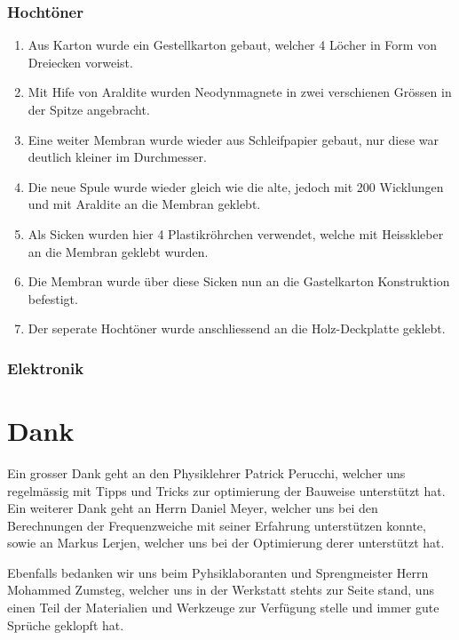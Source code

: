 \documentclass[a4paper,11pt]{report}
\begin{document}
\subsection{Hochtöner}
\begin{enumerate}
    \item Aus Karton wurde ein Gestellkarton gebaut, welcher 4 Löcher in Form von Dreiecken vorweist.
    \item Mit Hife von Araldite wurden Neodynmagnete in zwei verschienen Grössen in der Spitze angebracht.
    \item Eine weiter Membran wurde wieder aus Schleifpapier gebaut, nur diese war deutlich kleiner im Durchmesser.
    \item Die neue Spule wurde wieder gleich wie die alte, jedoch mit 200 Wicklungen und mit Araldite an die Membran geklebt.
    \item Als Sicken wurden hier 4 Plastikröhrchen verwendet, welche mit Heisskleber an die Membran geklebt wurden.
    \item Die Membran wurde über diese Sicken nun an die Gastelkarton Konstruktion befestigt.
    \item Der seperate Hochtöner wurde anschliessend an die Holz-Deckplatte geklebt.
\end{enumerate}
\subsection{Elektronik}

\chapter*{Dank}
Ein grosser Dank geht an den Physiklehrer Patrick Perucchi, welcher uns regelmässig mit Tipps und Tricks zur optimierung der Bauweise unterstützt hat.
Ein weiterer Dank geht an Herrn Daniel Meyer, welcher uns bei den Berechnungen der Frequenzweiche mit seiner Erfahrung unterstützen konnte, sowie an Markus Lerjen, welcher uns bei der Optimierung derer unterstützt hat.

Ebenfalls bedanken wir uns beim Pyhsiklaboranten und Sprengmeister Herrn Mohammed Zumsteg, welcher uns in der Werkstatt stehts zur Seite stand, uns einen Teil der Materialien und Werkzeuge zur Verfügung stelle und immer gute Sprüche geklopft hat.

\newpage
\listoffigures

\newpage


\end{document}
